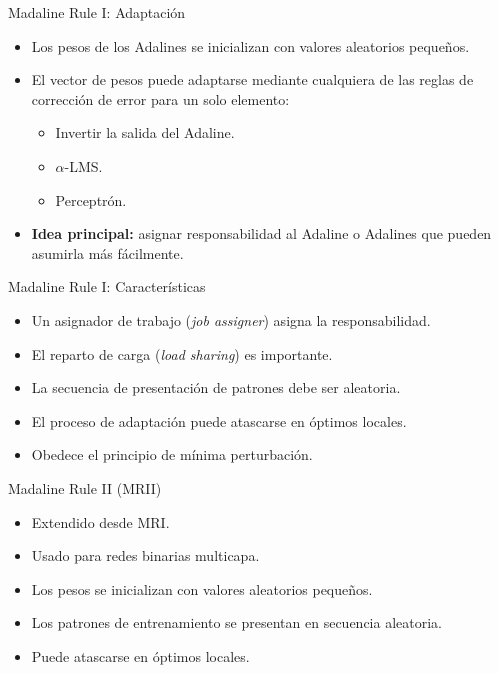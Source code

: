 \documentclass[aspectratio=169,utf8,spanish]{beamer}
\begin{document}
\begin{frame}{Madaline Rule I: Adaptación}
  \begin{itemize}
    \item Los pesos de los Adalines se inicializan con valores aleatorios pequeños.
    \item El vector de pesos puede adaptarse mediante cualquiera de las reglas de corrección de error para un solo elemento:
    \begin{itemize}
      \item Invertir la salida del Adaline.
      \item $\alpha$-LMS.
      \item Perceptrón.
    \end{itemize}
    \item \textbf{Idea principal:} asignar responsabilidad al Adaline o Adalines que pueden asumirla más fácilmente.
  \end{itemize}
\end{frame}

\begin{frame}{Madaline Rule I: Características}
  \begin{itemize}
    \item Un asignador de trabajo (\textit{job assigner}) asigna la responsabilidad.
    \item El reparto de carga (\textit{load sharing}) es importante.
    \item La secuencia de presentación de patrones debe ser aleatoria.
    \item El proceso de adaptación puede atascarse en óptimos locales.
    \item Obedece el principio de mínima perturbación.
  \end{itemize}
\end{frame}

\begin{frame}{Madaline Rule II (MRII)}
  \begin{itemize}
    \item Extendido desde MRI.
    \item Usado para redes binarias multicapa.
    \item Los pesos se inicializan con valores aleatorios pequeños.
    \item Los patrones de entrenamiento se presentan en secuencia aleatoria.
    \item Puede atascarse en óptimos locales.
  \end{itemize}
\end{frame}
\end{document}
